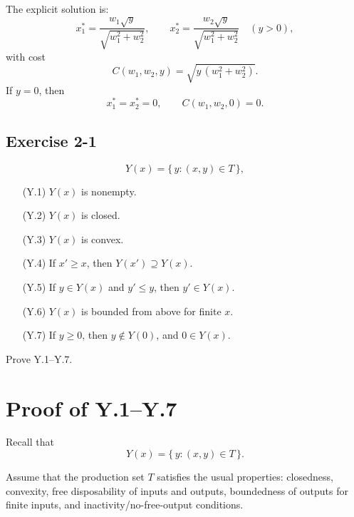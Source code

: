 The explicit solution is:
\[
\boxed{
x_1^*
=
\frac{w_1\sqrt{y}}{\sqrt{w_1^2+w_2^2}},
\qquad
x_2^*
=
\frac{w_2\sqrt{y}}{\sqrt{w_1^2+w_2^2}}
\quad (y>0),
}
\]
with cost
\[
\boxed{
C(w_1,w_2,y)=\sqrt{y\,(w_1^2+w_2^2)}.
}
\]
If \(y=0\), then
\[
\boxed{x_1^*=x_2^*=0,\qquad C(w_1,w_2,0)=0.}
\]




\vspace{30pt}
\begin{tcolorbox}[breakable]

\subsection*{Exercise 2-1}

\[
Y(x)=\{\,y : (x,y)\in T\,\},
\]

\begin{itemize}
\item[(Y.1)] \(Y(x)\) is nonempty.
\item[(Y.2)] \(Y(x)\) is closed.
\item[(Y.3)] \(Y(x)\) is convex.
\item[(Y.4)] If \(x' \geq x\), then \(Y(x') \supseteq Y(x)\).
\item[(Y.5)] If \(y \in Y(x)\) and \(y' \leq y\), then \(y' \in Y(x)\).
\item[(Y.6)] \(Y(x)\) is bounded from above for finite \(x\).
\item[(Y.7)] If \(y \ge 0\), then \(y \notin Y(0)\), and \(0 \in Y(x)\).
\end{itemize}

Prove Y.1--Y.7.

\end{tcolorbox}


\section*{Proof of Y.1--Y.7}

Recall that
\[
Y(x)=\{\,y:(x,y)\in T\,\}.
\]

Assume that the production set \(T\) satisfies the usual properties:
closedness, convexity, free disposability of inputs and outputs, boundedness of outputs for finite inputs, and inactivity/no-free-output conditions.

